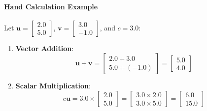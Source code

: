 \paragraph{Hand Calculation Example}
Let $\mathbf{u} = \begin{bmatrix} 2.0 \\ 5.0 \end{bmatrix}$, $\mathbf{v} = \begin{bmatrix} 3.0 \\ -1.0 \end{bmatrix}$, and $c = 3.0$:
\begin{enumerate}
    \item \textbf{Vector Addition}:
    \begin{equation*}
    \mathbf{u} + \mathbf{v} = \begin{bmatrix} 2.0 + 3.0 \\ 5.0 + (-1.0) \end{bmatrix} = \begin{bmatrix} 5.0 \\ 4.0 \end{bmatrix}
    \end{equation*}
    \item \textbf{Scalar Multiplication}:
    \begin{equation*}
    c\mathbf{u} = 3.0 \times \begin{bmatrix} 2.0 \\ 5.0 \end{bmatrix} = \begin{bmatrix} 3.0 \times 2.0 \\ 3.0 \times 5.0 \end{bmatrix} = \begin{bmatrix} 6.0 \\ 15.0 \end{bmatrix}
    \end{equation*}
\end{enumerate}

